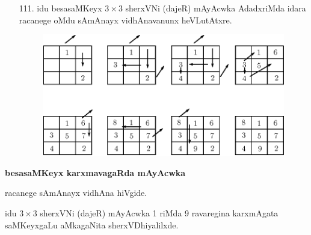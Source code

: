 \begin{enumerate}
\item[{\rm 111.}] idu besasaMKeyx $3\times 3$ sherxVNi (dajeR) mAyAcwka AdadxriMda idara racanege oMdu sAmAnayx vidhAnavanunx heVLutAtxre.
\begin{figure}[H]
\centering
\includegraphics[scale=.8]{src/figures/m_117a.eps}
\end{figure}
\end{enumerate}

{\bf besasaMKeyx karxmavagaRda mAyAcwka}

racanege sAmAnayx vidhAna hiVgide.

idu $3\times 3$ sherxVNi (dajeR) mAyAcwka {\rm 1} riMda {\rm 9} ravaregina karxmAgata saMKeyxgaLu aMkagaNita sherxVDhiyalilxde.

